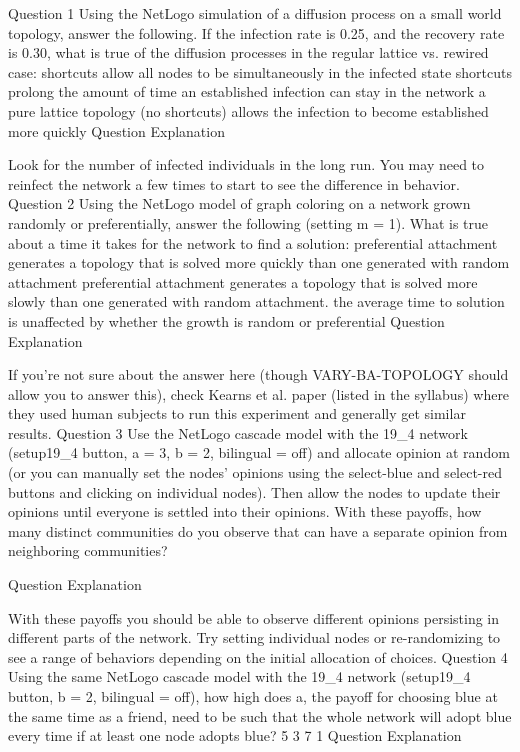 Question 1
Using the NetLogo simulation of a diffusion process on a small world topology, answer the following. If the 
infection rate is 0.25, and the recovery rate is 0.30, what is true of the diffusion processes in the regular
lattice vs. rewired case:
shortcuts allow all nodes to be simultaneously in the infected state
shortcuts prolong the amount of time an established infection can stay in the network
a pure lattice topology (no shortcuts) allows the infection to become established more quickly
Question Explanation

Look for the number of infected individuals in the long run. You may need to reinfect the network a 
few times to start to see the difference in behavior.
Question 2
Using the NetLogo model of graph coloring on a network grown randomly or preferentially, answer the following
(setting m = 1). What is true about a time it takes for the network to find a solution:
preferential attachment generates a topology that is solved more quickly than one generated with random attachment
preferential attachment generates a topology that is solved more slowly than one generated with random attachment.
the average time to solution is unaffected by whether the growth is random or preferential
Question Explanation

If you're not sure about the answer here (though VARY-BA-TOPOLOGY should allow you to answer this), 
check Kearns et al. paper (listed in the syllabus) where they used human subjects to run this experiment and generally
get similar results.
Question 3
Use the NetLogo cascade model with the 19_4 network (setup19_4 button, a = 3, b = 2, bilingual = off) and allocate 
opinion at random (or you can manually set the nodes' opinions using the select-blue and select-red buttons and 
clicking on individual nodes). Then allow the nodes to update their opinions until everyone is settled into 
their opinions. With these payoffs, how many distinct communities do you observe that can have a separate opinion from neighboring communities?

Question Explanation

With these payoffs you should be able to observe different opinions persisting 
in different parts of the network. Try setting individual nodes or re-randomizing to see a range of behaviors
depending on the initial allocation of choices.
Question 4
Using the same NetLogo cascade model with the 19_4 network (setup19_4 button, b = 2, bilingual = off), how high does a, the payoff for choosing blue at the same time as a friend, need to be such that the whole network will adopt blue every time if at least one node adopts blue?
5
3
7
1
Question Explanation

